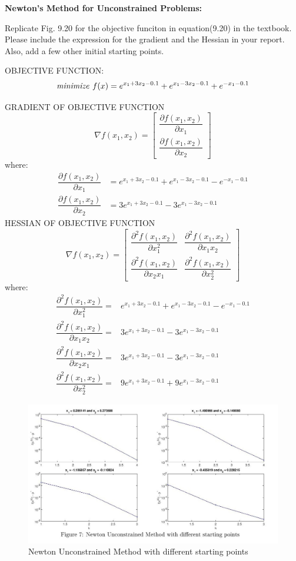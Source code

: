 \begin{prob}[2]\textbf{Newton's Method for Unconstrained Problems:}
\end{prob}
Replicate Fig. 9.20 for the objective funciton in equation(9.20) in the textbook. Please include the
  expression for the gradient and the Hessian in your report. Also, add a few other initial starting points.

OBJECTIVE FUNCTION:
\[
\mbox{\textit{minimize }} f(x) = e^{x_{1} + 3 x_{2} - 0.1} + e^{x_{1} - 3x_{2} - 0.1} + e^{-x_{1} - 0.1}
\]

GRADIENT OF OBJECTIVE FUNCTION
\[
\nabla f(x_{1}, x_{2}) = \begin{bmatrix}
\dfrac{\partial f(x_{1}, x_{2})}{\partial x_{1}}\\
\dfrac{\partial f(x_{1}, x_{2})}{\partial x_{2}}
\end{bmatrix}
\]
where:
\begin{eqnarray*}
\dfrac{\partial f(x_{1}, x_{2})}{\partial x_{1}} &= e^{x_{1} + 3 x_{2} - 0.1} + e^{x_{1} - 3x_{2} - 0.1} - e^{-x_{1} - 0.1}\\
\dfrac{\partial f(x_{1}, x_{2})}{\partial x_{2}} &= 3 e^{x_{1} + 3 x_{2} - 0.1} - 3e^{x_{1} - 3x_{2} - 0.1}
\end{eqnarray*}
HESSIAN OF OBJECTIVE FUNCTION
\[
\nabla f(x_{1}, x_{2}) = \begin{bmatrix}
\dfrac{\partial^{2} f(x_{1}, x_{2})}{\partial x_{1}^{2}} & \dfrac{\partial^{2} f(x_{1}, x_{2})}{\partial x_{1} x_{2}}\\
\dfrac{\partial^{2} f(x_{1}, x_{2})}{\partial x_{2} x_{1}} & \dfrac{\partial^{2} f(x_{1}, x_{2})}{\partial x_{2}^{2}}
\end{bmatrix}
\]
where:
\begin{eqnarray*}
\dfrac{\partial^{2} f(x_{1}, x_{2})}{\partial x_{1}^{2}} =& e^{x_{1} + 3 x_{2} - 0.1} + e^{x_{1} - 3x_{2} - 0.1} - e^{-x_{1} - 0.1}\\
\dfrac{\partial^{2} f(x_{1}, x_{2})}{\partial x_{1} x_{2}} =& 3 e^{x_{1} + 3 x_{2} - 0.1} - 3e^{x_{1} - 3x_{2} - 0.1}\\
\dfrac{\partial^{2} f(x_{1}, x_{2})}{\partial x_{2} x_{1}} =& 3 e^{x_{1} + 3 x_{2} - 0.1} - 3e^{x_{1} - 3x_{2} - 0.1}\\
\dfrac{\partial^{2} f(x_{1}, x_{2})}{\partial x_{2}^{2}} =& 9 e^{x_{1} + 3 x_{2} - 0.1} + 9e^{x_{1} - 3x_{2} - 0.1}
\end{eqnarray*}
  \begin{figure}[H]
  \centering
\includegraphics[width=\textwidth]{source/prob2/fig1}
\caption{Newton Unconstrained Method with different starting points}
\end{figure}
